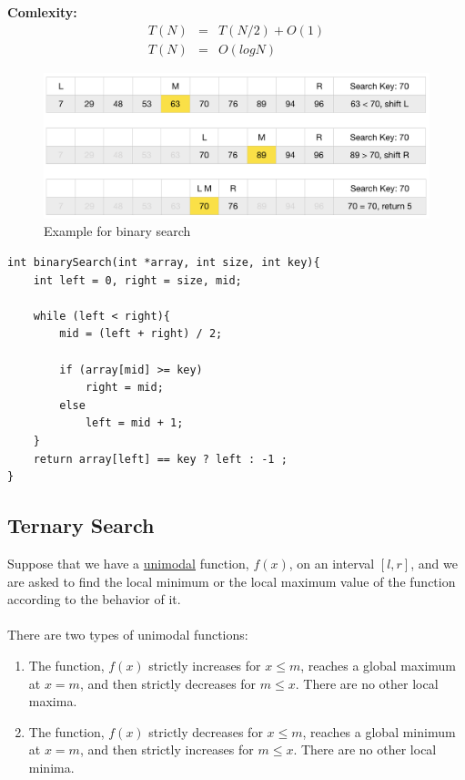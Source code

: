 \documentclass[12pt]{article}
\begin{document}
\textbf{Comlexity: }
\begin{eqnarray*}
T(N) &=& T(N / 2) + O(1) \\
T(N) &=& O(logN)
\end{eqnarray*}


\begin{figure}[h]
	\centering
	\includegraphics[width=0.9\linewidth]{binary_search}
	\caption{Example for binary search}
	\label{fig:binary_search}
\end{figure}

\cleardoublepage

\begin{verbatim}
int binarySearch(int *array, int size, int key){
    int left = 0, right = size, mid;

    while (left < right){
        mid = (left + right) / 2;

        if (array[mid] >= key)
            right = mid;
        else
            left = mid + 1;
    }
    return array[left] == key ? left : -1 ;
}
\end{verbatim}

				\cleardoublepage
		\subsection{Ternary Search}

Suppose that we have a \href{https://www.geeksforgeeks.org/mathematics-unimodal-functions-bimodal-functions/}{unimodal} function, $f(x)$, on an interval $[l, r]$, and we are asked to find the local minimum or the local maximum value of the function according to the behavior of it. \\ \\
There are two types of unimodal functions:

\begin{enumerate}
	\item The function, $f(x)$ strictly increases for $x \leq m$, reaches a global maximum at $x = m$, and then strictly decreases for $m \leq x$. There are no other local maxima.
	
	\item The function, $f(x)$ strictly decreases for $x \leq m$, reaches a global minimum at $x = m$, and then strictly increases for $m \leq x$. There are no other local minima.
\end{enumerate}
\end{document}
